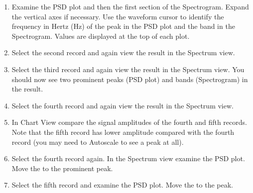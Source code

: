 \documentclass[letterpaper,10pt,english]{jupyterBook}
\begin{document}
\begin{enumerate}
\begin{itemize}
\end{itemize}

\sphinxAtStartPar
{}

\item {} 
\sphinxAtStartPar
Examine the PSD plot and then the first section of the Spectrogram. Expand the vertical axes if necessary. Use the waveform cursor to identify the frequency in Hertz (Hz) of the peak in the PSD plot and the band in the Spectrogram. Values are displayed at the top of each plot.

\sphinxAtStartPar
{}

\item {} 
\sphinxAtStartPar
Select the second record and again view the result in the Spectrum view.

\sphinxAtStartPar
{}

\item {} 
\sphinxAtStartPar
Select the third record and again view the result in the Spectrum view. You should now see two prominent peaks (PSD plot) and bands (Spectrogram) in the result.

\sphinxAtStartPar
{}

\item {} 
\sphinxAtStartPar
Select the fourth record and again view the result in the Spectrum view.

\sphinxAtStartPar
{}

\item {} 
\sphinxAtStartPar
In Chart View compare the signal amplitudes of the fourth and fifth records. Note that the fifth record has lower amplitude compared with the fourth record (you may need to Autoscale to see a peak at all).

\item {} 
\sphinxAtStartPar
Select the fourth record again. In the Spectrum view examine the PSD plot. Move the  to the prominent peak.

\sphinxAtStartPar
{}

\sphinxAtStartPar
{}

\item {} 
\sphinxAtStartPar
Select the fifth record and examine the PSD plot. Move the  to the peak.


\end{enumerate}
\end{document}
